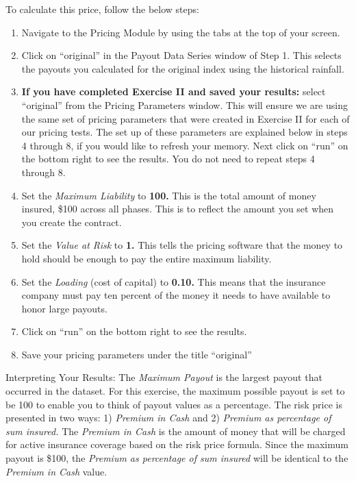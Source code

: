 \documentclass[letterpaper,10pt,english]{sphinxmanual}
\begin{document}
To calculate this price, follow the below steps:
\begin{enumerate}
\item {} 
Navigate to the Pricing Module by using the tabs at the top of your screen.

\item {} 
Click on ``original'' in the Payout Data Series window of Step 1.  This selects the payouts you calculated for the original index using the historical rainfall.

\item {} 
\textbf{If you have completed Exercise II and saved your results:} select ``original'' from the Pricing Parameters window. This will ensure we are using the same set of pricing parameters that were created in Exercise II for each of our pricing tests. The set up of these parameters are explained below in steps 4 through 8, if you would like to refresh your memory. Next click on ``run'' on the bottom right to see the results. You do not need to repeat steps 4 through 8.

\item {} 
Set the \emph{Maximum Liability} to \textbf{100.} This is the total amount of money insured, \$100 across all phases. This is to reflect the amount you set when you create the contract.

\item {} 
Set the \emph{Value at Risk} to \textbf{1.} This tells the pricing software that the money to hold should be enough to pay the entire maximum liability.

\item {} 
Set the \emph{Loading} (cost of capital) to \textbf{0.10.}  This means that the insurance company must pay ten percent of the money it needs to have available to honor large payouts.

\item {} 
Click on ``run'' on the bottom right to see the results.

\item {} 
Save your pricing parameters under the title ``original''

\end{enumerate}

Interpreting Your Results: The \emph{Maximum Payout} is the largest payout that occurred in the dataset. For this exercise, the maximum possible payout is set to be 100 to enable you to think of payout values as a percentage. The risk price is presented in two ways: 1) \emph{Premium in Cash} and 2) \emph{Premium as percentage of sum insured.} The \emph{Premium in Cash} is the amount of money that will be charged for active insurance coverage based on the risk price formula. Since the maximum payout is \$100, the \emph{Premium as percentage of sum insured} will be identical to the \emph{Premium in Cash} value.
\end{document}
